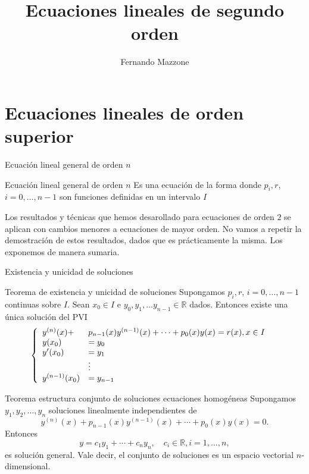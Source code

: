 \documentclass[handout,hyperref={colorlinks=true}]{beamer}
\title[Ecuaciones lineales de segundo orden] %
{%
 Ecuaciones lineales de segundo orden
}
\author[] %
{Fernando Mazzone}
\institute[Depto de Matemática] %
{
 Depto de Matemática\\
Facultad de Ciencias Exactas Físico-Químicas y Naturales\\
Universidad Nacional de Río Cuarto}
\newcommand{\rr}{\mathbb{R}}
\begin{document}
\section{Ecuaciones lineales de orden superior}

\begin{frame}{Ecuación lineal general de orden $n$}
\begin{block}{Ecuación lineal general de orden $n$}
Es una ecuación de la forma
donde $p_i,r$, $i=0,\ldots,n-1$ son funciones definidas en un intervalo $I$
\end{block}


Los resultados y técnicas que hemos desarollado para ecuaciones de orden $2$ se aplican con cambios menores a ecuaciones de mayor orden. No vamos a repetir la demostración de estos resultados, dados que es prácticamente la misma. Los exponemos de manera sumaria.
\end{frame}

\begin{frame}{Existencia y unicidad de soluciones}
\begin{block}{Teorema de existencia y unicidad de soluciones}
 Supongamos $p_i,r$, $i=0,\ldots,n-1$ continuas sobre $I$. Sean $x_0\in I$ e $y_0,y_1,\ldots y_{n-1}\in\rr$ dados. Entonces existe una única solución del PVI
 \[\left\{
 \begin{array}{l l l}
   y^{(n)}(x)+&p_{n-1}(x)y^{(n-1)}(x)+\cdots+p_0(x)y(x)=r(x),x\in I\\
   y(x_0)&=y_0&\\
   y'(x_0)&=y_1&\\
   &\vdots\\
  y^{(n-1)}(x_0)&=y_{n-1}&\\
  \end{array}\right.
\]

\end{block}
\end{frame}

\begin{frame}

\begin{block}{Teorema estructura conjunto de soluciones ecuaciones homogéneas}
Supongamos $y_1,y_2,\ldots,y_n$ soluciones linealmente independientes de 
\[y^{(n)}(x)+p_{n-1}(x)y^{(n-1)}(x)+\cdots+p_0(x)y(x)=0.\]
Entonces 
\[y=c_1y_1+\cdots+c_ny_n,\quad c_i\in\rr, i=1,\ldots,n,\]
es solución general. Vale decir, el conjunto de soluciones es un espacio vectorial $n$-dimensional.
\end{block}
\end{frame}
\end{document}
